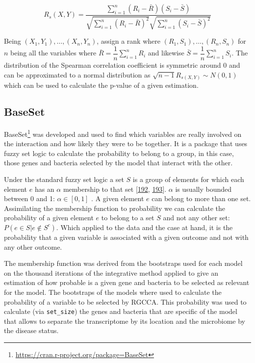 \documentclass[
  a4paper,
]{book}
\DeclareRobustCommand{\href}[2]{#2\footnote{\url{#1}}}
\begin{document}
\[
R_s(X,Y) = \dfrac{\sum_{i=1}^n (R_i - \bar{R}) (S_i - \bar{S} )}{\sqrt{\sum_{i=1}^n (R_i - \bar{R})^2}\sqrt{\sum_{i=1}^n (S_i - \bar{S})^2}}
\]

Being \((X_1 , Y_1 ),\dots, (X_n , Y_n)\), assign a rank where \((R_1 , S_1 ), \dots , (R_n , S_n )\) for \(n\) being all the variables where \(\bar{R}=\dfrac{1}{n}\sum_{i=1}^n R_i\) and likewise \(\bar{S}=\dfrac{1}{n}\sum_{i=1}^n S_i\).
The distribution of the Spearman correlation coefficient is symmetric around 0 and can be approximated to a normal distribution as \(\sqrt{n-1}R_{s(X,Y)} \sim N(0,1)\) which can be used to calculate the p-value of a given estimation.

\hypertarget{baseset}{%
\subsection{BaseSet}\label{baseset}}

\href{https://cran.r-project.org/package=BaseSet}{BaseSet} was developed and used to find which variables are really involved on the interaction and how likely they were to be together.
It is a package that uses fuzzy set logic to calculate the probability to belong to a group, in this case, those genes and bacteria selected by the model that interact with the other.

Under the standard fuzzy set logic a set \(S\) is a group of elements for which each element \(e\) has an \(\alpha\) membership to that set {[}\protect\hyperlink{ref-filzmoser2004}{192}, \protect\hyperlink{ref-dubois1993}{193}{]}.
\(\alpha\) is usually bounded between 0 and 1: \(\alpha \in [0, 1]\) .
A given element \(e\) can belong to more than one set.
Assimilating the membership function to probability we can calculate the probability of a given element \(e\) to belong to a set \(S\) and not any other set: \(P(e \in S|e \not \in S^c)\).
Which applied to the data and the case at hand, it is the probability that a given variable is associated with a given outcome and not with any other outcome.

The membership function was derived from the bootstraps used for each model on the thousand iterations of the integrative method applied to give an estimation of how probable is a given gene and bacteria to be selected as relevant for the model.
The bootstraps of the models where used to calculate the probability of a variable to be selected by RGCCA.
This probability was used to calculate (via \texttt{set\_size}) the genes and bacteria that are specific of the model that allows to separate the transcriptome by its location and the microbiome by the disease status.
\end{document}

